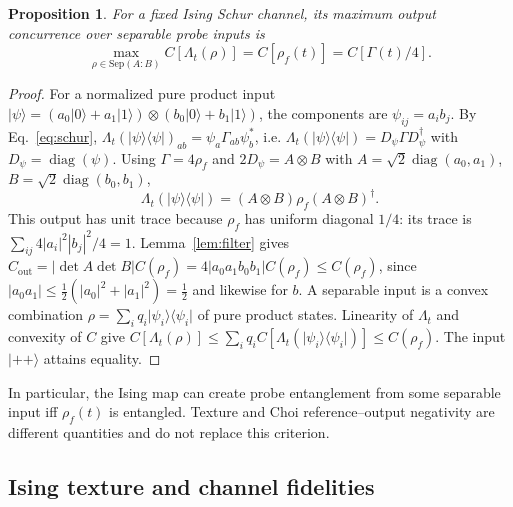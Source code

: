 \documentclass[11pt,a4paper]{article}
\newcommand{\ket}[1]{\lvert #1\rangle}
\newcommand{\bra}[1]{\langle #1\rvert}
\newcommand{\diag}{\operatorname{diag}}
\newtheorem{proposition}{Proposition}[section]
\begin{document}
\begin{proposition}
For a fixed Ising Schur channel, its maximum output concurrence over
separable probe inputs is
\begin{equation}
 \max_{\rho\in\mathrm{Sep}(A:B)}C[\Lambda_t(\rho)]
 =C[\rho_f(t)]=C[\Gamma(t)/4].
 \label{eq:cgen}
\end{equation}
\end{proposition}
\begin{proof}
For a normalized pure product input
$\ket\psi=(a_0\ket0+a_1\ket1)\otimes(b_0\ket0+b_1\ket1)$, the components
are $\psi_{ij}=a_ib_j$. By Eq.~\eqref{eq:schur},
$\Lambda_t(\ket\psi\bra\psi)_{ab}=\psi_a\Gamma_{ab}\psi_b^*$, i.e.
$\Lambda_t(\ket\psi\bra\psi)=D_\psi\Gamma D_\psi^\dagger$ with
$D_\psi=\diag(\psi)$. Using $\Gamma=4\rho_f$ and $2D_\psi=A\otimes B$ with
$A=\sqrt2\diag(a_0,a_1)$, $B=\sqrt2\diag(b_0,b_1)$,
\begin{equation}
 \Lambda_t(\ket\psi\bra\psi)=(A\otimes B)\rho_f(A\otimes B)^\dagger .
\end{equation}
This output has unit trace because $\rho_f$ has uniform diagonal $1/4$:
its trace is $\sum_{ij}4|a_i|^2|b_j|^2/4=1$. Lemma~\ref{lem:filter} gives
$C_{\mathrm{out}}=|\det A\det B|C(\rho_f)=4|a_0a_1b_0b_1|C(\rho_f)\le C(\rho_f)$,
since $|a_0a_1|\le\frac12(|a_0|^2+|a_1|^2)=\frac12$ and likewise for $b$.
A separable input is a convex combination
$\rho=\sum_iq_i\ket{\psi_i}\bra{\psi_i}$ of pure product states.
Linearity of $\Lambda_t$ and convexity of $C$ give
$C[\Lambda_t(\rho)]\le\sum_iq_iC[\Lambda_t(\ket{\psi_i}\bra{\psi_i})]\le C(\rho_f)$.
The input $\ket{++}$ attains equality.
\end{proof}
In particular, the Ising map can create probe entanglement from some
separable input iff $\rho_f(t)$ is entangled. Texture and Choi
reference--output negativity are different quantities and do not replace
this criterion.

\subsection{Ising texture and channel fidelities}
\label{sec:zztexture}
\end{document}
